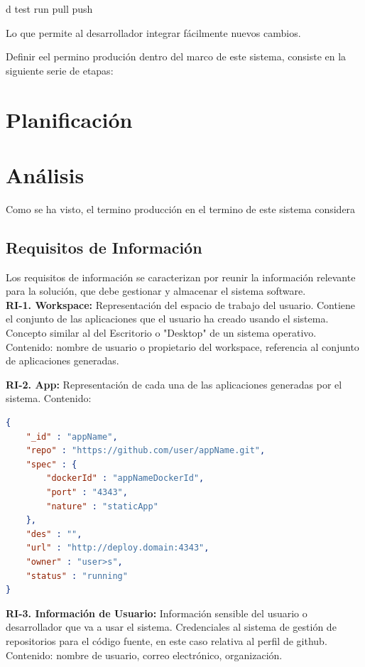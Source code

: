 \documentclass[a4paper,11pt]{book}
\begin{document}
d
test
run
pull
push

Lo que permite al desarrollador integrar fácilmente nuevos cambios. 

Definir eel permino produción dentro del marco de este sistema, consiste en la siguiente serie de etapas:

\section{Planificación}


\section{Análisis}

Como se ha visto, el termino producción en el termino de este sistema considera 

\subsection{Requisitos de Información }
Los requisitos de información se caracterizan por reunir la información relevante para la solución, que debe gestionar y almacenar el sistema software.\\

\textbf{RI-1. Workspace:} Representación del espacio de trabajo del usuario. Contiene el conjunto de las aplicaciones que el usuario ha creado usando el sistema. Concepto similar al del Escritorio o "Desktop" de un sistema operativo. 
Contenido: nombre de usuario o propietario del workspace, referencia al conjunto de aplicaciones generadas.


\textbf{RI-2. App:} Representación de cada una de las aplicaciones generadas por el sistema. 
Contenido:
\begin{lstlisting}[language=json,firstnumber=1]
{
    "_id" : "appName",
    "repo" : "https://github.com/user/appName.git",
    "spec" : {
        "dockerId" : "appNameDockerId",
        "port" : "4343",
        "nature" : "staticApp"
    },
    "des" : "",
    "url" : "http://deploy.domain:4343",
    "owner" : "user>s",
    "status" : "running"
}
\end{lstlisting}

\textbf{RI-3. Información de Usuario:} Información sensible del usuario o desarrollador que va a usar el sistema. Credenciales al sistema de gestión de repositorios para el código fuente, en este caso relativa al perfil de github. 
Contenido: nombre de usuario, correo electrónico, organización. \\
\end{document}
